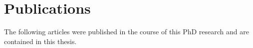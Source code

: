 \chapter*{Publications}

The following articles were published in the course of this PhD research and are contained in this thesis.


\begin{refsection}[ownpubs]
    \small
    \nocite{*} %
    \printbibliography[heading=none]
\end{refsection}

